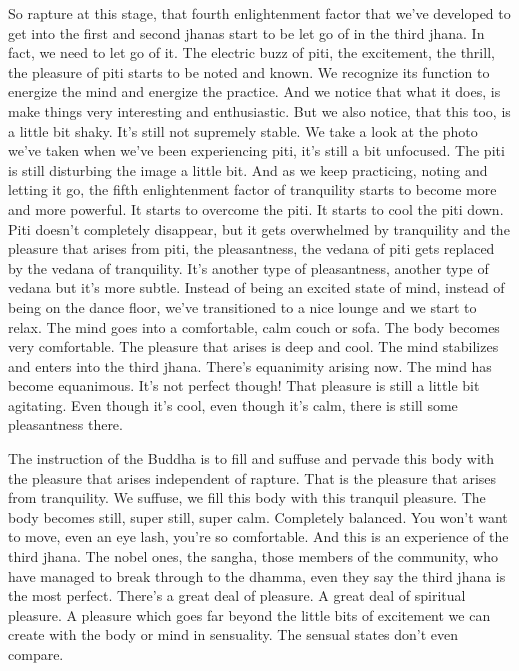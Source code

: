 \documentclass[letterpaper,10pt,english]{sphinxmanual}
\begin{document}
\sphinxAtStartPar
So  rapture  at  this  stage,  that  fourth  enlightenment  factor  that  we’ve
developed to get into the first and second jhanas start to be let go of in the
third  jhana.  In  fact,  we  need  to  let  go  of  it.  The  electric  buzz  of  piti,  the
excitement, the thrill, the pleasure of piti starts to be noted and known. We
recognize its function to energize the mind and energize the practice. And
we notice that what it does, is make things very interesting and enthusiastic.
But we also notice, that this too, is a little bit shaky. It’s still not supremely
stable. We take a look at the photo we’ve taken when we’ve been experiencing piti, it’s still a bit unfocused. The piti is still disturbing the image a little
bit. And as we keep practicing, noting and letting it go, the fifth enlightenment factor of tranquility starts to become more and more powerful. It starts
to overcome the piti. It starts to cool the piti down. Piti doesn’t completely
disappear, but it gets overwhelmed by tranquility and the pleasure that arises
from piti, the pleasantness, the vedana of piti gets replaced by the vedana of
tranquility. It’s another type of pleasantness, another type of vedana but it’s
more subtle. Instead of being an excited state of mind, instead of being on
the dance floor, we’ve transitioned to a nice lounge and we start to relax. The
mind goes into a comfortable, calm couch or sofa. The body becomes very
comfortable. The pleasure that arises is deep and cool. The mind stabilizes
and enters into the third jhana. There’s equanimity arising now. The mind
has become equanimous. It’s not perfect though! That pleasure is still a little
bit agitating. Even though it’s cool, even though it’s calm, there is still some
pleasantness there.

\sphinxAtStartPar
The  instruction  of  the  Buddha  is  to  fill  and  suffuse  and  pervade  this
body with the pleasure that arises independent of rapture. That is the pleasure that arises from tranquility. We suffuse, we fill this body with this tranquil  pleasure. The  body  becomes  still,  super  still,  super  calm.  Completely
balanced. You won’t want to move, even an eye lash, you’re so comfortable.
  And  this  is  an  experience  of  the  third  jhana.  The  nobel  ones,  the  sangha,
those members of the community, who have managed to break through to
the dhamma, even they say the third jhana is the most perfect. There’s a great
deal of pleasure. A great deal of spiritual pleasure. A pleasure which goes far
beyond the little bits of excitement we can create with the body or mind in
sensuality. The sensual states don’t even compare.
\end{document}
